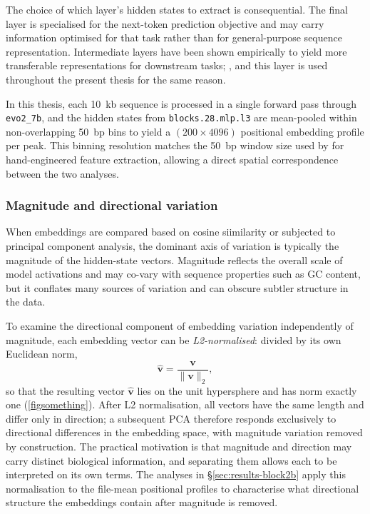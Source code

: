 The choice of which layer's hidden states to extract is consequential.
The final layer is specialised for the next-token prediction objective and may carry
information optimised for that task rather than for general-purpose sequence representation.
Intermediate layers have been shown empirically to yield more transferable representations
for downstream tasks;
, and this layer is used throughout the present thesis for the same reason.

In this thesis, each 10~kb sequence is processed in a single forward pass through
\texttt{evo2\_7b}, and the hidden states from \texttt{blocks.28.mlp.l3} are mean-pooled
within non-overlapping 50~bp bins to yield a $(200 \times 4096)$ positional embedding
profile per peak.
This binning resolution matches the 50~bp window size used by
\citet{faltejskovaNonconsensusFlankingSequence2026a} for hand-engineered feature extraction,
allowing a direct spatial correspondence between the two analyses.

\subsubsection{Magnitude and directional variation}

When embeddings are compared based on cosine siimilarity or subjected to principal component analysis, the dominant axis of variation is typically the magnitude of the hidden-state  vectors.
Magnitude reflects the overall scale of model activations and may co-vary with sequence properties such as GC content, but it conflates many sources of variation and can obscure subtler structure in the data.

To examine the directional component of embedding variation independently of magnitude, each embedding vector can be \emph{L2-normalised}: divided by its own Euclidean norm,
\begin{equation}
  \hat{\mathbf{v}} = \frac{\mathbf{v}}{\|\mathbf{v}\|_2},
\end{equation}
so that the resulting vector $\hat{\mathbf{v}}$ lies on the unit hypersphere and has norm exactly one (\ref{figsomething}).
After L2 normalisation, all vectors have the same length and differ only in direction;
a subsequent PCA therefore responds exclusively to directional differences in the embedding space, with magnitude variation removed by construction.
The practical motivation is that magnitude and direction may carry distinct biological information, and separating them allows each to be interpreted on its own terms.
The analyses in §\ref{sec:results-block2b} apply this normalisation to the file-mean positional profiles to characterise what directional structure the embeddings contain after magnitude is removed.


